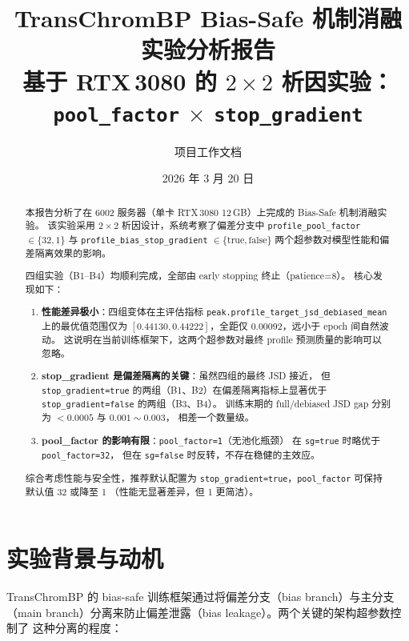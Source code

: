 \documentclass[11pt,a4paper]{ctexart}
\title{TransChromBP Bias-Safe 机制消融实验分析报告\\
\large 基于 RTX\,3080 的 $2 \times 2$ 析因实验：\texttt{pool\_factor} $\times$ \texttt{stop\_gradient}}
\author{项目工作文档}
\date{2026 年 3 月 20 日}
\begin{document}
\maketitle

\begin{abstract}
本报告分析了在 6002 服务器（单卡 RTX\,3080 12\,GB）上完成的 Bias-Safe 机制消融实验。
该实验采用 $2 \times 2$ 析因设计，系统考察了偏差分支中
\texttt{profile\_pool\_factor} $\in \{32, 1\}$ 与
\texttt{profile\_bias\_stop\_gradient} $\in \{\mathrm{true}, \mathrm{false}\}$
两个超参数对模型性能和偏差隔离效果的影响。

四组实验（B1--B4）均顺利完成，全部由 early stopping 终止（patience=8）。
核心发现如下：

\begin{enumerate}[leftmargin=2em]
  \item \textbf{性能差异极小}：四组变体在主评估指标
    \texttt{peak.profile\_target\_jsd\_debiased\_mean} 上的最优值范围仅为
    $[0.44130, 0.44222]$，全距仅 $0.00092$，远小于 epoch 间自然波动。
    这说明在当前训练框架下，这两个超参数对最终 profile 预测质量的影响可以忽略。
  \item \textbf{stop\_gradient 是偏差隔离的关键}：虽然四组的最终 JSD 接近，
    但 \texttt{stop\_gradient=true} 的两组（B1、B2）在偏差隔离指标上显著优于
    \texttt{stop\_gradient=false} 的两组（B3、B4）。
    训练末期的 full/debiased JSD gap 分别为 $< 0.0005$ 与 $0.001 \sim 0.003$，
    相差一个数量级。
  \item \textbf{pool\_factor 的影响有限}：\texttt{pool\_factor=1}（无池化瓶颈）
    在 \texttt{sg=true} 时略优于 \texttt{pool\_factor=32}，
    但在 \texttt{sg=false} 时反转，不存在稳健的主效应。
\end{enumerate}

综合考虑性能与安全性，推荐默认配置为
\texttt{stop\_gradient=true}，\texttt{pool\_factor} 可保持默认值 32 或降至 1
（性能无显著差异，但 1 更简洁）。
\end{abstract}

\tableofcontents

\section{实验背景与动机}

TransChromBP 的 bias-safe 训练框架通过将偏差分支（bias branch）与主分支
（main branch）分离来防止偏差泄露（bias leakage）。两个关键的架构超参数控制了
这种分离的程度：
\end{document}
